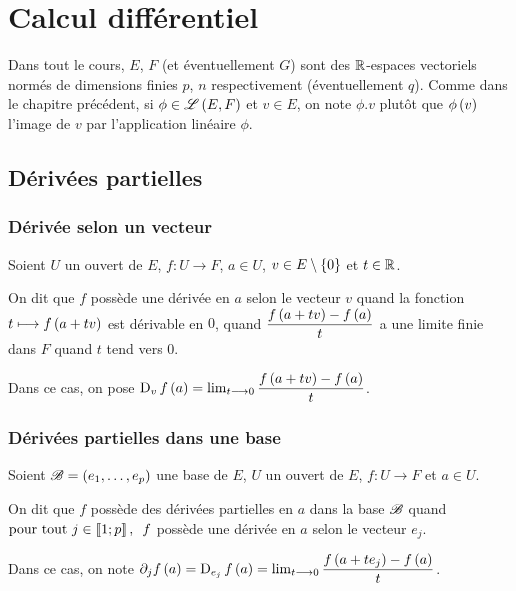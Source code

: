 \chapter{Calcul différentiel}

\minitoc

Dans tout le cours, \(E\), \(F\) (et éventuellement \(G\)) sont des \(\mathbb{R}\)-espaces vectoriels normés de dimensions finies \(p\), \(n\) respectivement (éventuellement \(q\)). Comme dans le chapitre précédent, si \(\phi\in\mathscr{L}\left(E,F\right)\) et \(v\in E\), on note \(\phi.v\) plutôt que \(\phi\left(v\right)\) l'image de \(v\) par l'application linéaire \(\phi\).

\section{Dérivées partielles}

\subsection{Dérivée selon un vecteur}

\begin{defi}
Soient \(U\) un ouvert de \(E\), \(f:U\to F\), \(a\in U\), \(v\in E\setminus\left\lbrace0\right\rbrace\) et \(t\in\mathbb{R}\).

On dit que \(f\) possède une dérivée en \(a\) selon le vecteur \(v\) quand la fonction \(t\longmapsto f\left(a+tv\right)\) est dérivable en \(0\), \ie quand \(\dfrac{f\left(a+tv\right)-f\left(a\right)}{t}\) a une limite finie dans \(F\) quand \(t\) tend vers \(0\).

Dans ce cas, on pose \(\operatorname{D}_{v}f\left(a\right)=\lim_{t\longrightarrow0}\dfrac{f\left(a+tv\right)-f\left(a\right)}{t}\).
\end{defi}

\subsection{Dérivées partielles dans une base}

\begin{defi}
Soient \(\mathscr{B}=\left(e_1,\dots,e_p\right)\) une base de \(E\), \(U\) un ouvert de \(E\), \(f:U\to F\) et \(a\in U\).

On dit que \(f\) possède des dérivées partielles en \(a\) dans la base \(\mathscr{B}\) quand \(\quantifs{\tpt j\in\interventierii{1}{p}}f\) possède une dérivée en \(a\) selon le vecteur \(e_j\).

Dans ce cas, on note \(\pdif{j}f\paren{a}=\vdv{e_j}{f}\paren{a}=\lim_{t\to0}\dfrac{f\paren{a+te_j}-f\paren{a}}{t}\).
\end{defi}

